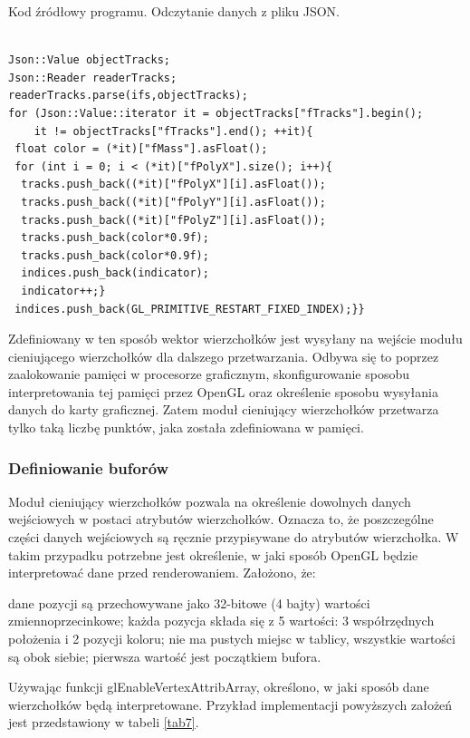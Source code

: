 \begin{table}[H]
\caption{Kod źródłowy programu. Odczytanie danych z pliku JSON.}
\label{tab6}
\begin{lstlisting}[frame=single]  % Start your code-block

Json::Value objectTracks;
Json::Reader readerTracks;
readerTracks.parse(ifs,objectTracks);
for (Json::Value::iterator it = objectTracks["fTracks"].begin(); 
	it != objectTracks["fTracks"].end(); ++it){
 float color = (*it)["fMass"].asFloat();
 for (int i = 0; i < (*it)["fPolyX"].size(); i++){
  tracks.push_back((*it)["fPolyX"][i].asFloat());
  tracks.push_back((*it)["fPolyY"][i].asFloat());
  tracks.push_back((*it)["fPolyZ"][i].asFloat());
  tracks.push_back(color*0.9f);
  tracks.push_back(color*0.9f);
  indices.push_back(indicator);
  indicator++;}
 indices.push_back(GL_PRIMITIVE_RESTART_FIXED_INDEX);}}
\end{lstlisting}
\end{table}

Zdefiniowany w ten sposób wektor wierzchołków jest wysyłany na wejście modułu cieniującego wierzchołków dla dalszego przetwarzania. Odbywa się to poprzez zaalokowanie pamięci w procesorze graficznym, skonfigurowanie sposobu interpretowania tej pamięci przez OpenGL oraz określenie sposobu wysyłania danych do karty graficznej. Zatem moduł cieniujący wierzchołków przetwarza tylko taką liczbę punktów, jaka została zdefiniowana w pamięci.

\subsubsection{Definiowanie buforów}
Moduł cieniujący wierzchołków pozwala na określenie dowolnych danych wejściowych w postaci atrybutów wierzchołków. Oznacza to, że poszczególne części danych wejściowych są ręcznie przypisywane do atrybutów wierzchołka. W takim przypadku potrzebne jest określenie, w jaki sposób OpenGL będzie interpretować dane przed renderowaniem. Założono, że:
\begin{itemize}
\itemi dane pozycji są przechowywane jako 32-bitowe (4 bajty) wartości zmiennoprzecinkowe;
\itemi każda pozycja składa się z 5 wartości: 3 współrzędnych położenia i 2 pozycji koloru;
\itemi nie ma pustych miejsc w tablicy, wszystkie wartości są obok siebie;
\itemi pierwsza wartość jest początkiem bufora.
\end{itemize}
Używając funkcji glEnableVertexAttribArray, określono, w jaki sposób dane wierzchołków będą interpretowane. Przykład implementacji powyższych założeń jest przedstawiony w tabeli \ref{tab7}.

